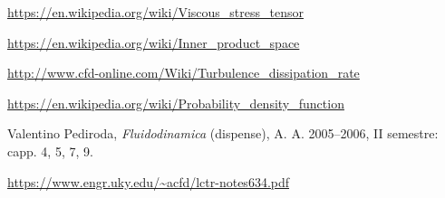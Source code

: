 \documentclass[12pt,a4paper]{article}
\numberwithin{equation}{section}
\begin{document}
\begin{thebibliography}{11}
  \url{https://en.wikipedia.org/wiki/Viscous_stress_tensor}

  \url{https://en.wikipedia.org/wiki/Inner_product_space}
  
  \url{http://www.cfd-online.com/Wiki/Turbulence_dissipation_rate}  
  
  \url{https://en.wikipedia.org/wiki/Probability_density_function}
  
  Valentino Pediroda, 
  \emph{Fluidodinamica} (dispense), A. A. 2005--2006, II semestre: capp. 4, 5, 7, 9.
  
  \url{https://www.engr.uky.edu/~acfd/lctr-notes634.pdf}  
  
\end{thebibliography}
\end{document}

